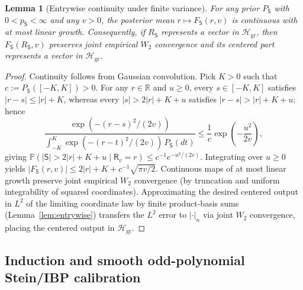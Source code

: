 \documentclass[11pt]{article}
\theoremstyle{plain}
\newtheorem{lemma}[theorem]{Lemma}
\theoremstyle{definition}
\theoremstyle{remark}
\newcommand{\Prob}{\mathbb{P}}
\newcommand{\R}{\mathbb{R}}
\newcommand{\sS}{\mathsf{S}}
\newcommand{\sR}{\mathsf{R}}
\begin{document}
\begin{lemma}[Entrywise continuity under finite variance]\label{lem:entry-cont}
For any prior $P_{\sS}$ with $0 < p_{\sS} < \infty$ and any $v > 0$, the posterior mean $r \mapsto F_{\sS}(r, v)$ is continuous with at most linear growth. Consequently, if $R_{\sS}$ represents a vector in $\mathcal{H}_{\mathrm{gr}}$, then $F_{\sS}(R_{\sS}, v)$ preserves joint empirical $W_2$ convergence and its centered part represents a vector in $\mathcal{H}_{\mathrm{gr}}$.
\end{lemma}

\begin{proof}
Continuity follows from Gaussian convolution. Pick $K > 0$ such that $c := P_{\sS}([-K, K]) > 0$. For any $r \in \R$ and $u \ge 0$, every $s \in [-K, K]$ satisfies $|r - s| \le |r| + K$, whereas every $|s| > 2|r| + K + u$ satisfies $|r - s| > |r| + K + u$; hence
\[
\frac{\exp(-(r-s)^2/(2v))}{\int_{-K}^{K} \exp(-(r-t)^2/(2v))\,P_{\sS}(dt)}
\le \frac{1}{c}\exp\!\left(-\frac{u^2}{2v}\right),
\]
giving $\Prob(|\sS| > 2|r| + K + u \mid \sR_v = r) \le c^{-1} e^{-u^2/(2v)}$. Integrating over $u \ge 0$ yields $|F_{\sS}(r, v)| \le 2|r| + K + c^{-1}\sqrt{\pi v / 2}$. Continuous maps of at most linear growth preserve joint empirical $W_2$ convergence (by truncation and uniform integrability of squared coordinates). Approximating the desired centered output in $L^2$ of the limiting coordinate law by finite product-basis sums (Lemma~\ref{lem:entrywise}) transfers the $L^2$ error to $|\cdot|_n$ via joint $W_2$ convergence, placing the centered output in $\mathcal{H}_{\mathrm{gr}}$.
\end{proof}

\subsection{Induction and smooth odd-polynomial Stein/IBP calibration}
\end{document}
